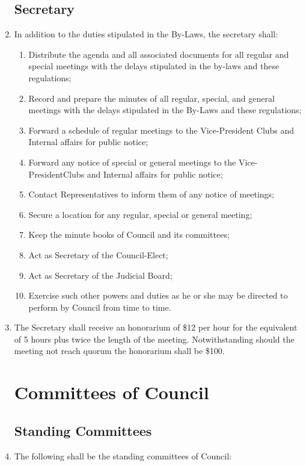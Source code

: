 \documentclass[oneside]{book}
\begin{document}
\begin{enumerate}
\section{\label{Secretary}Secretary }
\item In addition to the duties stipulated in the By-Laws, the secretary
shall: 

\begin{enumerate}
\item Distribute the agenda and all associated documents for all regular
and special meetings with the delays stipulated in the by-laws and
these regulations; 
\item Record and prepare the minutes of all regular, special, and general
meetings with the delays stipulated in the By-Laws and these regulations; 
\item Forward a schedule of regular meetings to the Vice-President Clubs
and Internal affairs for public notice; 
\item Forward any notice of special or general meetings to the Vice-PresidentClubs
and Internal affairs for public notice; 
\item Contact Representatives to inform them of any notice of meetings; 
\item Secure a location for any regular, special or general meeting; 
\item Keep the minute books of Council and its committees; 
\item Act as Secretary of the Council-Elect; 
\item Act as Secretary of the Judicial Board;
\item Exercise such other powers and duties as he or she may be directed
to perform by Council from time to time. 
\end{enumerate}
\item The Secretary shall receive an honorarium of \$12 per hour for the
equivalent of 5 hours plus twice the length of the meeting. Notwithstanding
should the meeting not reach quorum the honorarium shall be \$100. 

\chapter{\label{Committees_of_Council}Committees of Council }


\section{\label{Standing_Committees}Standing Committees }
\item The following shall be the standing committees of Council: 


\end{enumerate}
\end{document}
